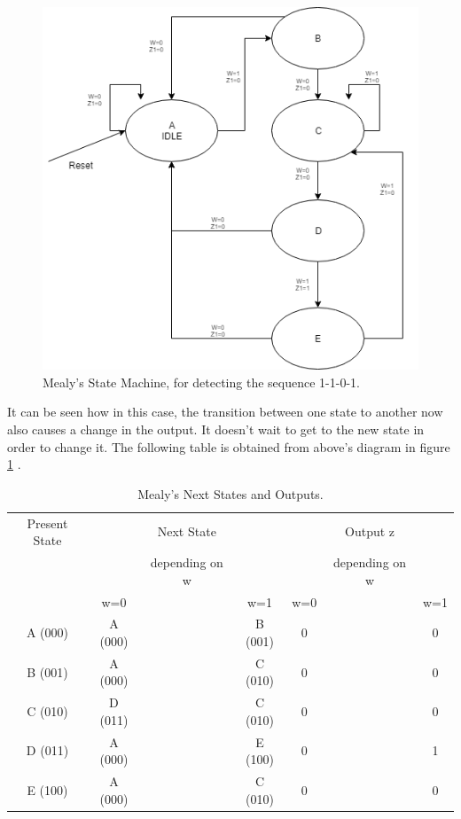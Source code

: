 \begin{figure}[H]
\centering
\includegraphics[scale=0.5]{../Exercise2/EJ2MEALY}
\caption{\color{cyan}Mealy's State Machine, for detecting the sequence 1-1-0-1.}
\label{MealyEFSM}
\end{figure}

It can be seen how in this case, the transition between one state to another now also causes a change in the output. It doesn't wait to get to the new state in order to change it. The following table is obtained from above's diagram in figure \ref {measej2} .

\begin{table}[H]
\begin{center}
\begin{tabular}{|c|c c c|c c c|}
\hline
Present State & & Next State & & & Output z & \\
 &  & depending on w& & & depending on w&  \\
 & w=0 & & w=1 & w=0& &w=1  \\
\hline
\hline
A (000)& A (000)& & B (001)& 0 & & 0   \\
\hline
B  (001)& A (000)& & C  (010)& 0 & & 0   \\
\hline
C (010)& D (011)& & C  (010)& 0 & & 0 \\
\hline
D (011)& A (000)& & E (100) & 0 & & 1  \\
\hline
E (100)& A (000)& & C  (010)& 0 & & 0 \\
\hline
\hline
\end{tabular}
\end{center}
\caption{\label{measej2}\color{cyan}Mealy's Next States and Outputs.}
\end{table}

